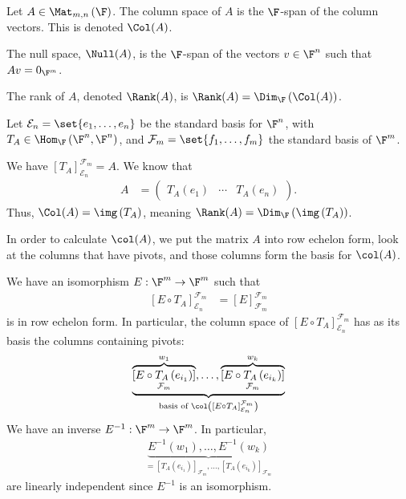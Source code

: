 \documentclass[10pt]{mypackage}
\begin{document}
\begin{definition}
  Let $A\in \Mat_{m,n}\left(\F\right)$. The column space of $A$ is the $\F$-span of the column vectors. This is denoted $\Col(A)$.\newline

  The null space, $\Null(A)$, is the $\F$-span of the vectors $v\in \F^n$ such that $Av = 0_{\F^m}$.\newline

  The rank of $A$, denoted $\Rank(A)$, is $\Rank(A) = \Dim_{\F}\left(\Col(A)\right)$.
\end{definition}
  Let $\mathcal{E}_n = \set{e_1,\dots,e_n}$ be the standard basis for $\F^n$, with $T_A \in \Hom_{\F}\left(\F^n,\F^n\right)$, and $\mathcal{F}_m = \set{f_1,\dots,f_m}$ the standard basis of $\F^m$.\newline

  We have $\left[T_A\right]_{\mathcal{E}_n}^{\mathcal{F}_m} = A$. We know that
  \begin{align*}
    A &= \begin{pmatrix}T_A\left(e_1\right) & \cdots & T_A\left(e_n\right)\end{pmatrix}.
  \end{align*}
  Thus, $\Col(A) = \img\left(T_A\right)$, meaning $\Rank(A) = \Dim_{\F}\left(\img\left(T_A\right)\right)$.\newline

In order to calculate $\col(A)$, we put the matrix $A$ into row echelon form, look at the columns that have pivots, and those columns form the basis for $\col(A)$.\newline

We have an isomorphism $E: \F^m\rightarrow \F^m$ such that
\begin{align*}
  \left[E\circ T_A\right]_{\mathcal{E}_n}^{\mathcal{F}_m} &= \left[E\right]_{\mathcal{F}_m}^{\mathcal{F}_m}
\end{align*}
is in row echelon form. In particular, the column space of $\left[E\circ T_A\right]_{\mathcal{E}_n}^{\mathcal{F}_m}$ has as its basis the columns containing pivots:
\begin{align*}
  \underbrace{\overbrace{\left[E\circ T_A\left(e_{i_1}\right)\right]}^{w_1}_{\mathcal{F}_m},\dots,\overbrace{\left[E\circ T_A\left(e_{i_k}\right)\right]}^{w_k}_{\mathcal{F}_m}}_{\text{basis of }\col\left(\left[E\circ T_A\right]_{\mathcal{E}_n}^{\mathcal{F}_m}\right)}
\end{align*}
We have an inverse $E^{-1}: \F^{m}\rightarrow \F^m$. In particular,
\begin{align*}
  \underbrace{E^{-1}\left(w_1\right),\dots,E^{-1}\left(w_k\right)}_{=\left[T_{A}\left(e_{i_1}\right)\right]_{\mathcal{F}_m},\dots,\left[T_{A}\left(e_{i_k}\right)\right]_{\mathcal{F}_m}}
\end{align*}
are linearly independent since $E^{-1}$ is an isomorphism.\newline
\end{document}
